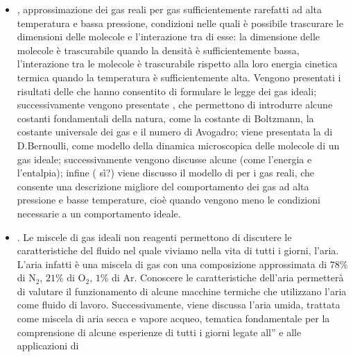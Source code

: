 \documentclass[letterpaper,10pt,italian]{jupyterBook}
\begin{document}
\begin{itemize}
\item {} 
\sphinxAtStartPar
{\hyperref[\detokenize{ch/thermodynamics/ideal-gas:physics-hs-thermodynamics-matter-gases-ideal}]{}}, approssimazione dei gas reali per gas sufficientemente rarefatti ad alta temperatura e bassa pressione, condizioni nelle quali è possibile trascurare le dimensioni delle molecole e l’interazione tra di esse: la dimensione delle molecole è trascurabile quando la densità è sufficientemente bassa, l’interazione tra le molecole è trascurabile rispetto alla loro energia cinetica termica quando la temperatura è sufficientemente alta. Vengono presentati i risultati delle {\hyperref[\detokenize{ch/thermodynamics/ideal-gas-experiments:physics-hs-thermodynamics-matter-gases-ideal-experiments}]{}} che hanno consentito di formulare le legge dei gas ideali; successivamente vengono presentate {\hyperref[\detokenize{ch/thermodynamics/ideal-gas-expressions:physics-hs-thermodynamics-matter-gases-ideal-expressions}]{}}, che permettono di introdurre alcune costanti fondamentali della natura, come la costante di Boltzmann, la costante universale dei gas e il numero di Avogadro; viene presentata la {\hyperref[\detokenize{ch/thermodynamics/ideal-gas-kinetic-theory:physics-hs-thermodynamics-matter-gases-ideal-kinetic-theory}]{}} di D.Bernoulli, come modello della dinamica microscopica delle molecole di un gas ideale; successivamente vengono discusse alcune {\hyperref[\detokenize{ch/thermodynamics/ideal-gas-formulas:physics-hs-thermodynamics-matter-gases-ideal-formulas}]{}} (come l’energia e l’entalpia); infine ( sì?) viene discusso il modello di  per i gas reali, che consente una descrizione migliore del comportamento dei gas ad alta pressione e basse temperature, cioè quando vengono meno le condizioni necessarie a un comportamento ideale.

\item {} 
\sphinxAtStartPar
{\hyperref[\detokenize{ch/thermodynamics/gas-mixture:physics-hs-thermodynamics-matter-gases-mixture}]{}}. Le miscele di gas ideali non reagenti permettono di discutere le caratteristiche del fluido nel quale viviamo nella vita di tutti i giorni, l’aria. L’aria infatti è una miscela di gas con una composizione approssimata di \(78\%\) di \(\text{N}_2\), \(21\%\) di \(\text{O}_2\), \(1\%\) di \(\text{Ar}\). Conoscere le caratteristiche dell’aria permetterà di valutare il funzionamento di alcune macchine termiche che utilizzano l’aria come fluido di lavoro. Successivamente, viene discussa l’aria umida, trattata come miscela di aria secca e vapore acqueo, tematica fondamentale per la comprensione di alcune esperienze di tutti i giorni legate all” e alle applicazioni di 


\end{itemize}
\end{document}
